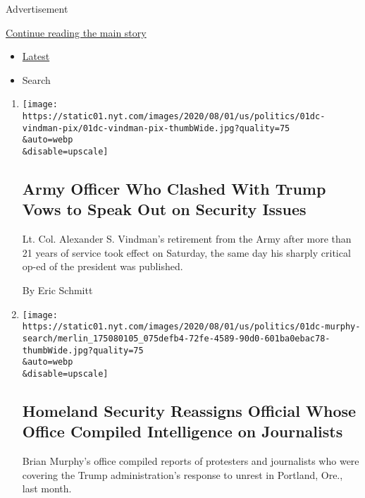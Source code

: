 Advertisement

\protect\hyperlink{after-mid1}{Continue reading the main story}

\begin{itemize}
\tightlist
\item
  \protect\hyperlink{stream-panel}{Latest}
\item
  Search
\end{itemize}

\begin{enumerate}
\def\labelenumi{\arabic{enumi}.}
\item
  \href{/2020/08/01/us/politics/alexander-vindman-impeachment-trump.html}{}

  \texttt{[image: https://static01.nyt.com/images/2020/08/01/us/politics/01dc-vindman-pix/01dc-vindman-pix-thumbWide.jpg?quality=75\\\&auto=webp\\\&disable=upscale]}

  \hypertarget{army-officer-who-clashed-with-trump-vows-to-speak-out-on-security-issues-1}{%
  \subsection{Army Officer Who Clashed With Trump Vows to Speak Out on
  Security
  Issues}\label{army-officer-who-clashed-with-trump-vows-to-speak-out-on-security-issues-1}}

  Lt. Col. Alexander S. Vindman's retirement from the Army after more
  than 21 years of service took effect on Saturday, the same day his
  sharply critical op-ed of the president was published.

  By Eric Schmitt
\item
  \href{/2020/08/01/us/politics/brian-murphy-homeland-security-protesters.html}{}

  \texttt{[image: https://static01.nyt.com/images/2020/08/01/us/politics/01dc-murphy-search/merlin\_175080105\_075defb4-72fe-4589-90d0-601ba0ebac78-thumbWide.jpg?quality=75\\\&auto=webp\\\&disable=upscale]}

  \hypertarget{homeland-security-reassigns-official-whose-office-compiled-intelligence-on-journalists-1}{%
  \subsection{Homeland Security Reassigns Official Whose Office Compiled
  Intelligence on
  Journalists}\label{homeland-security-reassigns-official-whose-office-compiled-intelligence-on-journalists-1}}

  Brian Murphy's office compiled reports of protesters and journalists
  who were covering the Trump administration's response to unrest in
  Portland, Ore., last month.


\end{enumerate}
